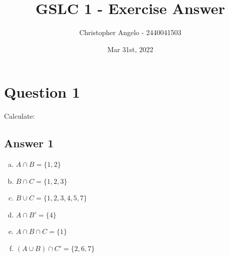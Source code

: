 \documentclass[
	11pt, %
]{assignment}
\author{Christopher Angelo - 2440041503}
\institute{BINUS University\\ Global Class}
\date{Mar 31st, 2022}
\title{GSLC 1 - Exercise Answer}
\begin{document}
\maketitle


\section*{Question 1}
\begin{problem}
Calculate:

\centering
{}
\end{problem}

\subsection*{Answer 1}

\begin{enumerate}[a.]
	\item \( A \cap B = \{ 1, 2 \} \)
	\item \( B \cap C = \{ 1, 2, 3 \} \)
	\item \( B \cup C = \{ 1, 2, 3, 4, 5, 7 \} \)
	\item \( A \cap B' = \{ 4 \} \)
	\item \( A \cap B \cap C = \{ 1 \} \)
	\item \( ( A \cup B ) \cap C' = \{ 2, 6, 7 \} \)
\end{enumerate}
\end{document}

